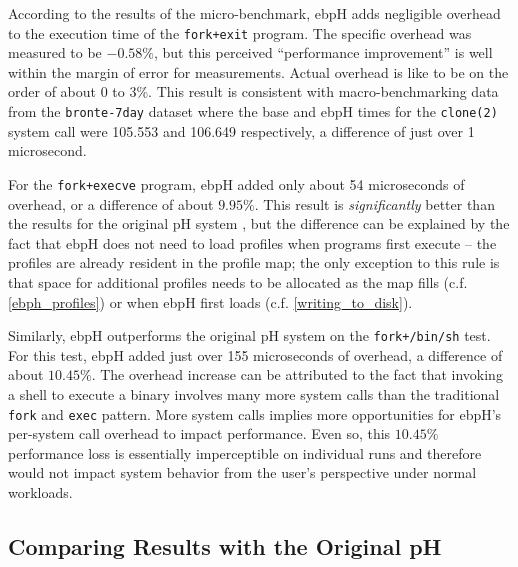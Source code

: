 \documentclass[
  12pt]{findlay}
\begin{document}
According to the results of the micro-benchmark, ebpH adds negligible
overhead to the execution time of the
\passthrough{\lstinline!fork+exit!} program. The specific overhead was
measured to be \(-0.58\%\), but this perceived ``performance
improvement'' is well within the margin of error for measurements.
Actual overhead is like to be on the order of about \(0\) to \(3\%\).
This result is consistent with macro-benchmarking data from the
\passthrough{\lstinline!bronte-7day!} dataset where the base and ebpH
times for the \passthrough{\lstinline!clone(2)!} system call were
105.553 and 106.649 respectively, a difference of just over 1
microsecond.

For the \passthrough{\lstinline!fork+execve!} program, ebpH added only
about 54 microseconds of overhead, or a difference of about \(9.95\%\).
This result is \emph{significantly} better than the results for the
original pH system \autocite{soma02}, but the difference can be
explained by the fact that ebpH does not need to load profiles when
programs first execute -- the profiles are already resident in the
profile map; the only exception to this rule is that space for
additional profiles needs to be allocated as the map fills (c.f.
\autoref{ebph_profiles}) or when ebpH first loads (c.f.
\autoref{writing_to_disk}).

Similarly, ebpH outperforms the original pH system \autocite{soma02} on
the \passthrough{\lstinline!fork+/bin/sh!} test. For this test, ebpH
added just over 155 microseconds of overhead, a difference of about
\(10.45\%\). The overhead increase can be attributed to the fact that
invoking a shell to execute a binary involves many more system
calls\footnotemark{} than the traditional \passthrough{\lstinline!fork!}
and \passthrough{\lstinline!exec!} pattern. More system calls implies
more opportunities for ebpH's per-system call overhead to impact
performance. Even so, this \(10.45\%\) performance loss is essentially
imperceptible on individual runs and therefore would not impact system
behavior from the user's perspective under normal workloads.

\FloatBarrier

\hypertarget{comparing-results-with-the-original-ph}{%
\subsection{Comparing Results with the Original
pH}\label{comparing-results-with-the-original-ph}}
\end{document}
